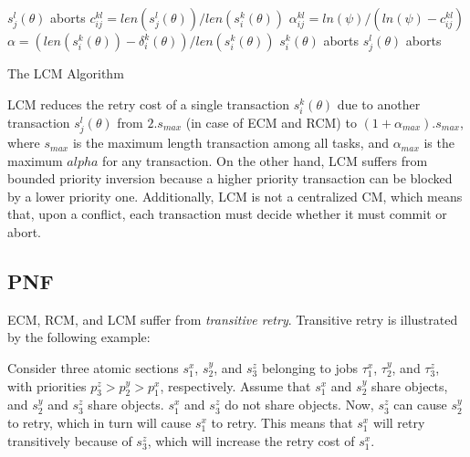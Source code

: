 \documentclass[prodmode,acmtecs]{acmsmall}
\begin{document}
\begin{algorithm}
\footnotesize{
\LinesNumbered
{}
	{$s_j^l(\theta)$ aborts\label{step_sicommits}\;}
	{$c_{ij}^{kl}=len(s_j^l(\theta))/len(s_i^k(\theta))$\label{step_cijkl}\;
	$\alpha_{ij}^{kl}=ln(\psi)/(ln(\psi)-c_{ij}^{kl})$\label{step_alphaijkl}\;
	$\alpha=\left(len(s_i^k(\theta))-\delta_i^k(\theta)\right)/len(s_i^k(\theta))$\;
	{$s_i^k(\theta)$ aborts\label{step_siaborts}\;}
	{$s_j^l(\theta)$ aborts\label{step_sjaborts}\;}
	}
	}
\caption{The LCM Algorithm}
\label{alg_lcm}
\end{algorithm}

LCM reduces the retry cost of a single transaction $s_i^k(\theta)$ due to another transaction $s_j^l(\theta)$ from $2.s_{max}$ (in case of ECM and RCM) to $(1+\alpha_{max}).s_{max}$, where $s_{max}$ is the maximum length transaction among all tasks, and $\alpha_{max}$ is the maximum $alpha$ for any transaction. On the other hand, LCM suffers from bounded priority inversion because a higher priority transaction can be blocked by a lower priority one. Additionally, LCM is not a centralized CM, which means that, upon a conflict, each transaction must decide whether it must commit or abort. 


\subsection{PNF}
\label{pnf overview}

ECM, RCM, and LCM suffer from \textit{transitive retry}. Transitive retry is illustrated by the following example:

Consider three atomic sections $s_{1}^{x}$, $s_{2}^{y}$, 
and $s_{3}^{z}$ belonging to jobs $\tau_{1}^{x}$, $\tau_{2}^{y}$, 
and $\tau_{3}^{z}$, with priorities $p_{3}^{z}>p_{2}^{y}>p_{1}^{x}$, respectively. 
Assume that $s_{1}^{x}$ and $s_{2}^{y}$ share objects, and $s_{2}^{y}$ and $s_{3}^{z}$ share objects. $s_{1}^{x}$ and $s_{3}^{z}$ do not share objects.
Now, $s_{3}^{z}$ can cause $s_{2}^{y}$ to retry, which in turn will cause $s_{1}^{x}$ to retry. This means that $s_{1}^{x}$ will retry transitively
because of $s_{3}^{z}$, which will increase the retry cost of $s_{1}^{x}$.
\end{document}
